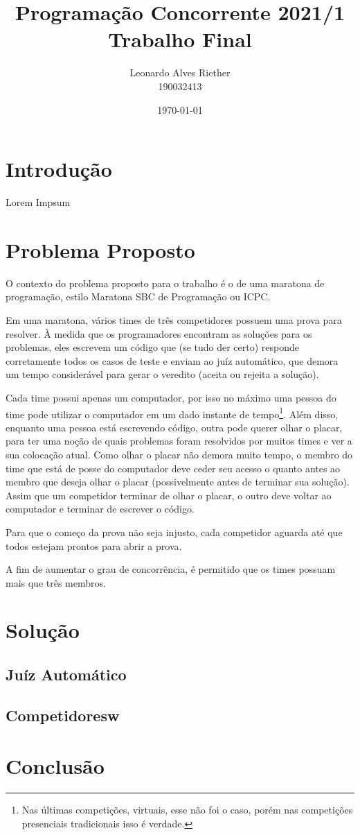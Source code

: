 \documentclass[11pt]{article}
\title{ Programação Concorrente 2021/1 \\
\Large{ Trabalho Final }}
\author{ Leonardo Alves Riether \\ 190032413 }
\date{\today}
\begin{document}
\maketitle
\pagebreak



\section{Introdução}

Lorem Impsum

\section{Problema Proposto}
O contexto do problema proposto para o trabalho é o de uma maratona de programação, estilo Maratona SBC
de Programação\cite{maratonasbc} ou ICPC\cite{icpc}.

Em uma maratona, vários times de três competidores possuem uma prova para resolver. À medida que os
programadores encontram as soluções para os problemas, eles escrevem um código que (se tudo der certo)
responde corretamente todos os casos de teste e enviam ao juíz automático, que demora um tempo
considerável para gerar o veredito (aceita ou rejeita a solução).

Cada time possui apenas um computador, por isso no máximo uma pessoa do time pode utilizar o computador
em um dado instante de tempo\footnote{Nas últimas competições, virtuais, esse não foi o caso, porém nas
competições presenciais tradicionais isso é verdade.}. Além disso, enquanto uma pessoa está escrevendo
código, outra pode querer olhar o placar, para ter uma noção de quais problemas foram resolvidos por
muitos times e ver a sua colocação atual. Como olhar o placar não demora muito tempo, o membro do time
que está de posse do computador deve ceder seu acesso o quanto antes ao membro que deseja olhar o placar
(possivelmente antes de terminar sua solução). Assim que um competidor terminar de olhar o placar, o
outro deve voltar ao computador e terminar de escrever o código.

Para que o começo da prova não seja injusto, cada competidor aguarda até que todos estejam prontos para
abrir a prova.

A fim de aumentar o grau de concorrência, é permitido que os times possuam mais que três membros.

\section{Solução}

\subsection{Juíz Automático}

\subsection{Competidoresw}


\section{Conclusão}


\medskip
\printbibliography
\end{document}
